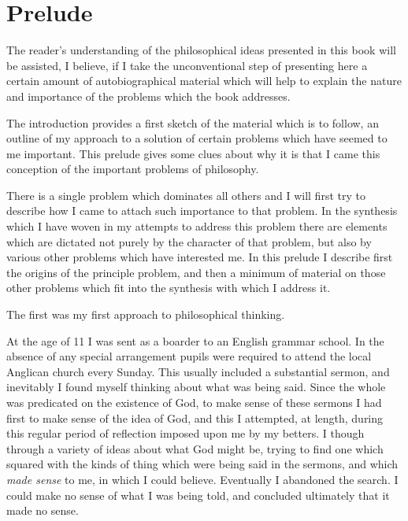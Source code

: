 \mainmatter
\def\rbjidprelude{$$Id: prelude.tex,v 1.1 2010/01/10 21:30:10 rbj Exp $$}
\chapter{Prelude}\label{Prelude}

The reader's understanding of the philosophical ideas presented in this book will be assisted, I believe, if I take the unconventional step of presenting here a certain amount of autobiographical material which will help to explain the nature and importance of the problems which the book addresses.

The introduction provides a first sketch of the material which is to follow, an outline of my approach to a solution of certain problems which have seemed to me important.
This prelude gives some clues about why it is that I came this conception of the important problems of philosophy.

There is a single problem which dominates all others and I will first try to describe how I came to attach such importance to that problem.
In the synthesis which I have woven in my attempts to address this problem there are elements which are dictated not purely by the character of that problem, but also by various other problems which have interested me.
In this prelude I describe first the origins of the principle problem, and then a minimum of material on those other problems which fit into the synthesis with which I address it.

The first was my first approach to philosophical thinking.

At the age of 11 I was sent as a boarder to an English grammar school.
In the absence of any special arrangement pupils were required to attend the local Anglican church every Sunday.
This usually included a substantial sermon, and inevitably I found myself thinking about what was being said.
Since the whole was predicated on the existence of God, to make sense of these sermons I had first to make sense of the idea of God, and this I attempted, at length, during this regular period of reflection imposed upon me by my betters.
I though through a variety of ideas about what God might be, trying to find one which squared with the kinds of thing which were being said in the sermons, and which {\it made sense} to me, in which I could believe.
Eventually I abandoned the search.
I could make no sense of what I was being told, and concluded ultimately that it made no sense.

